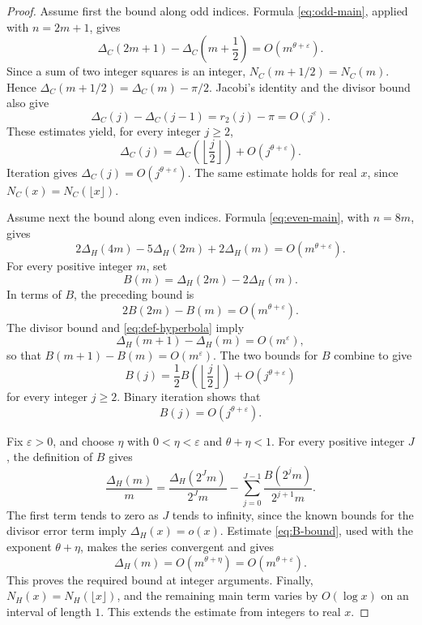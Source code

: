 \documentclass[10pt,a4paper]{amsart}
\newcommand{\eps}{\varepsilon}
\begin{document}
\begin{proof}
Assume first the bound along odd indices. Formula \eqref{eq:odd-main}, applied
with $n=2m+1$, gives
\[
 \Delta_C(2m+1)-\Delta_C\left(m+\frac12\right)
 =O(m^{\theta+\eps}).
\]
Since a sum of two integer squares is an integer,
$N_C(m+1/2)=N_C(m)$. Hence
$\Delta_C(m+1/2)=\Delta_C(m)-\pi/2$. Jacobi's identity and the
divisor bound also give
\[
 \Delta_C(j)-\Delta_C(j-1)=r_2(j)-\pi=O(j^\eps).
\]
These estimates yield, for every integer $j\geq 2$,
\[
 \Delta_C(j)=\Delta_C\left(\left\lfloor\frac j2\right\rfloor\right)
 +O(j^{\theta+\eps}).
\]
Iteration gives $\Delta_C(j)=O(j^{\theta+\eps})$. The same estimate holds
for real $x$, since $N_C(x)=N_C(\lfloor x\rfloor)$.

Assume next the bound along even indices. Formula \eqref{eq:even-main}, with
$n=8m$, gives
\[
 2\Delta_H(4m)-5\Delta_H(2m)+2\Delta_H(m)
 =O(m^{\theta+\eps}).
\]
For every positive integer $m$, set
\[
 B(m)=\Delta_H(2m)-2\Delta_H(m).
\]
In terms of $B$, the preceding bound is
\[
 2B(2m)-B(m)=O(m^{\theta+\eps}).
\]
The divisor bound and \eqref{eq:def-hyperbola} imply
\[
 \Delta_H(m+1)-\Delta_H(m)=O(m^\eps),
\]
so that $B(m+1)-B(m)=O(m^\eps)$. The two bounds for $B$ combine to give
\[
 B(j)=\frac12B\left(\left\lfloor\frac j2\right\rfloor\right)
 +O(j^{\theta+\eps})
\]
for every integer $j\geq 2$. Binary iteration shows that
\begin{equation}\label{eq:B-bound}
 B(j)=O(j^{\theta+\eps}).
\end{equation}

Fix $\eps>0$, and choose $\eta$ with
$0<\eta<\eps$ and $\theta+\eta<1$. For every positive integer $J$, the
definition of $B$ gives
\[
 \frac{\Delta_H(m)}m
 =\frac{\Delta_H(2^Jm)}{2^Jm}
 -\sum_{j=0}^{J-1}\frac{B(2^jm)}{2^{j+1}m}.
\]
The first term tends to zero as $J$ tends to infinity, since the known bounds
for the divisor error term imply $\Delta_H(x)=o(x)$. Estimate
\eqref{eq:B-bound}, used with the exponent $\theta+\eta$, makes the series
convergent and gives
\[
 \Delta_H(m)=O(m^{\theta+\eta})=O(m^{\theta+\eps}).
\]
This proves the required bound at integer arguments. Finally,
$N_H(x)=N_H(\lfloor x\rfloor)$, and the remaining main term varies by
$O(\log x)$ on an interval of length $1$. This extends the estimate from
integers to real $x$.
\end{proof}
\end{document}
